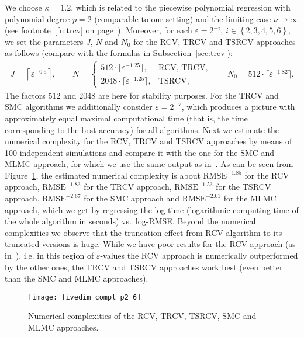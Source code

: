 \documentclass[11pt,a4paper]{amsart}
\theoremstyle{plain}
\theoremstyle{definition}
\theoremstyle{remark}
\numberwithin{equation}{section}
\begin{document}
We choose $\kappa=1.2$, which is related to the piecewise polynomial regression with polynomial degree $p=2$ (comparable to our setting) and the limiting case $\nu\to\infty$ (see footnote~\ref{fn:trcv} on page~\pageref{fn:trcv}). Moreover, for each $\varepsilon=2^{-i}$, $i\in\left\{2,3,4,5,6\right\}$,
we set the parameters $J$, $N$ and $N_0$ for the RCV,
TRCV and TSRCV approaches as follows
(compare with the formulas in Subsection~\ref{sec:trcv}):
\begin{align*}
J=\left\lceil \varepsilon^{-0.5}\right\rceil,\qquad
N=\begin{cases}
512\cdot\lceil \varepsilon^{-1.25}\rceil,&\text{RCV, TRCV},\\
2048\cdot\lceil \varepsilon^{-1.25}\rceil,&\text{TSRCV},
\end{cases}
\qquad 
N_0=512\cdot\lceil \varepsilon^{-1.82}\rceil.
\end{align*}
The factors 512 and 2048 are here for stability purposes.
For the TRCV and SMC algorithms we additionally consider
$\varepsilon=2^{-7}$,
which produces a picture with approximately equal
maximal computational time
(that is, the time corresponding to the best accuracy)
for all algorithms.
Next we estimate the numerical complexity for the RCV, TRCV and TSRCV approaches by means of 100 independent simulations and compare it with the one for the SMC and MLMC approach, for which we use the same output as in~\cite{belomestny2016variance}. As can be seen from Figure~\ref{compld}, the estimated numerical complexity is about $\text{RMSE}^{-1.85}$ for the RCV approach, $\text{RMSE}^{-1.83}$ for the TRCV approach,
$\text{RMSE}^{-1.53}$ for the TSRCV approach,
$\text{RMSE}^{-2.67}$ for the SMC approach and $\text{RMSE}^{-2.01}$ for the MLMC approach,
which we get by regressing the log-time (logarithmic computing time of the whole algorithm in seconds) vs.\ log-RMSE. Beyond the numerical complexities we observe that the truncation effect from RCV algorithm to its truncated versions is huge. While we have poor results for the RCV approach (as in~\cite{belomestny2016variance}), i.e. in this region of $\varepsilon$-values the RCV approach is numerically outperformed by the other ones, the TRCV and TSRCV approaches work best
(even better than the SMC and MLMC approaches).
\begin{figure}[htb!]
\texttt{[image: fivedim\_compl\_p2\_6]}
\caption{Numerical complexities of the RCV, TRCV, TSRCV, SMC and MLMC approaches.}
\label{compld}
\end{figure}
\end{document}
